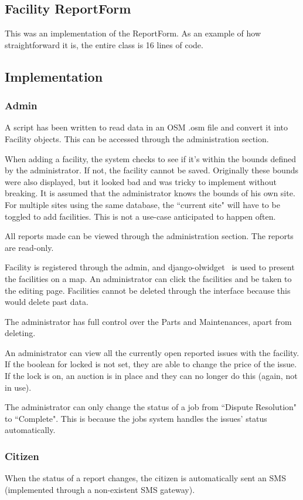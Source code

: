 \subsection{Facility ReportForm}
This was an implementation of the ReportForm. As an example of how straightforward it is, the entire class is 16 lines of code.

\subsection{Implementation}
\subsubsection{Admin}
A script has been written to read data in an \gls{OSM} .osm file and convert it into Facility objects. This can be accessed through the administration section.

When adding a facility, the system checks to see if it's within the bounds defined by the administrator. If not, the facility cannot be saved. Originally these bounds were also displayed, but it looked bad and was tricky to implement without breaking. It is assumed that the administrator knows the bounds of his own site. For multiple sites using the same database, the ``current site" will have to be toggled to add facilities. This is not a use-case anticipated to happen often.

All reports made can be viewed through the administration section. The reports are read-only.

Facility is registered through the admin, and django-olwidget~\cite{olwidget} is used to present the facilities on a map. An administrator can click the facilities and be taken to the editing page. Facilities cannot be deleted through the interface because this would delete past data.

The administrator has full control over the Parts and Maintenances, apart from deleting.

An administrator can view all the currently open reported issues with the facility. If the boolean for locked is not set, they are able to change the price of the issue. If the lock is on, an auction is in place and they can no longer do this (again, not in use).

The administrator can only change the status of a job from ``Dispute Resolution" to ``Complete". This is because the jobs system handles the issues' status automatically.

\subsubsection{Citizen}
When the status of a report changes, the citizen is automatically sent an SMS (implemented through a non-existent SMS gateway).

